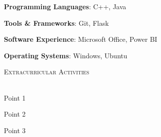 \documentclass[12pt]{article}   %
\renewcommand{\section}[1]{
    \textsc{#1}
    \vspace*{-10pt} \\ \hspace*{-5pt} 
    \hrulefill \\
    \vspace*{-15pt}
}
\newcommand{\smallbullet}{
    \small$\bullet$
}
\newenvironment{spaced-bullet-list-major}{
    \begin{list}{
        \smallbullet
    }{
        \setlength\leftmargin{15pt}\topsep 0pt
    }
} {
    \end{list}
}
\begin{document}
    \begin{spaced-bullet-list-major}
        \item \textbf{Programming Languages}: C++, Java
        \item \textbf{Tools \& Frameworks}: Git, Flask
        \item \textbf{Software Experience}: Microsoft Office, Power BI
        \item \textbf{Operating Systems}: Windows, Ubuntu
    \end{spaced-bullet-list-major} 


    \section{Extracurricular Activities}

    \begin{spaced-bullet-list-major}
        \item Point 1
        \item Point 2
        \item Point 3
    \end{spaced-bullet-list-major}


    \vspace*{-7.71mm}
\end{document}
